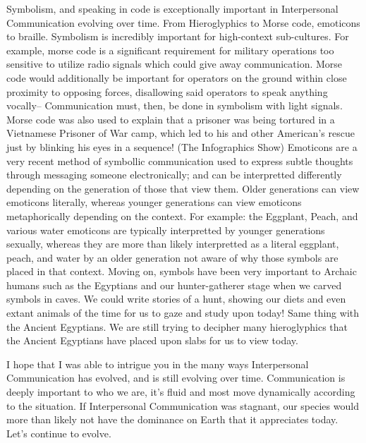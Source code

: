 \documentclass[12pt]{article}
\begin{document}
Symbolism, and speaking in code is exceptionally important in Interpersonal Communication evolving over time. From Hieroglyphics to Morse code, emoticons to braille. Symbolism is incredibly important for high-context sub-cultures. For example, morse code is a significant requirement for military operations too sensitive to utilize radio signals which could give away communication. Morse code would additionally be important for operators on the ground within close proximity to opposing forces, disallowing said operators to speak anything vocally-- Communication must, then, be done in symbolism with light signals. Morse code was also used to explain that a prisoner was being tortured in a Vietnamese Prisoner of War camp, which led to his and other American's rescue just by blinking his eyes in a sequence! (The Infographics Show) Emoticons are a very recent method of symbollic communication used to express subtle thoughts through messaging someone electronically; and can be interpretted differently depending on the generation of those that view them. Older generations can view emoticons literally, whereas younger generations can view emoticons metaphorically depending on the context. For example: the Eggplant, Peach, and various water emoticons are typically interpretted by younger generations sexually, whereas they are more than likely interpretted as a literal eggplant, peach, and water by an older generation not aware of why those symbols are placed in that context. Moving on, symbols have been very important to Archaic humans such as the Egyptians and our hunter-gatherer stage when we carved symbols in caves. We could write stories of a hunt, showing our diets and even extant animals of the time for us to gaze and study upon today! Same thing with the Ancient Egyptians. We are still trying to decipher many hieroglyphics that the Ancient Egyptians have placed upon slabs for us to view today.
\par
I hope that I was able to intrigue you in the many ways Interpersonal Communication has evolved, and is still evolving over time. Communication is deeply important to who we are, it's fluid and most move dynamically according to the situation. If Interpersonal Communication was stagnant, our species would more than likely not have the dominance on Earth that it appreciates today. Let's continue to evolve.
\end{document}
